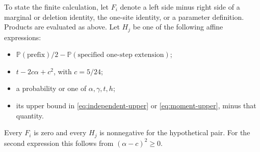 \documentclass[11pt]{article}
\newcommand{\Prob}{\mathbb P}
\begin{document}
To state the finite calculation, let $F_i$ denote a left side minus right
side of a marginal or deletion identity, the one-site identity, or a
parameter definition. Products are evaluated as above. Let $H_j$ be one
of the following affine expressions:
\begin{itemize}
\item $\Prob(\text{prefix})/2-\Prob(\text{specified one-step extension})$;
\item $t-2c\alpha+c^2$, with $c=5/24$;
\item a probability or one of $\alpha,\gamma,t,h$;
\item its upper bound in \eqref{eq:independent-upper} or
\eqref{eq:moment-upper}, minus that quantity.
\end{itemize}
Every $F_i$ is zero and every $H_j$ is nonnegative for the hypothetical pair.
For the second expression this follows from $(\alpha-c)^2\geq0$.
\end{document}
